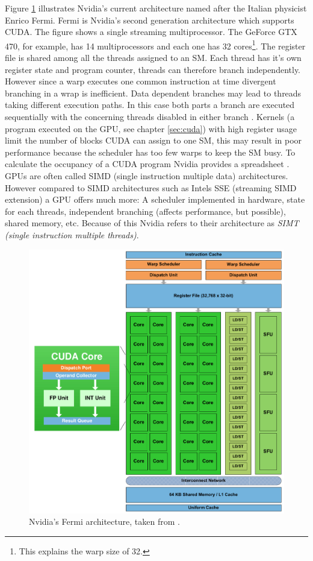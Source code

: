 Figure \ref{gfx:fermi} illustrates Nvidia's current architecture named after the Italian physicist Enrico Fermi. Fermi is Nvidia's second generation architecture which supports CUDA. The figure shows a single streaming multiprocessor. The GeForce GTX 470, for example, has 14 multiprocessors and each one has 32 cores\footnote{This explains the warp size of 32.}. The register file is shared among all the threads assigned to an SM. Each thread has it's own register state and program counter, threads can therefore branch independently. However since a warp executes one common instruction at time divergent branching in a wrap is inefficient. Data dependent branches may lead to threads taking different execution paths. In this case both parts a branch are executed sequentially with the concerning threads disabled in either branch \cite[Chapter 4.1]{cudaguide}. Kernels (a program executed on the GPU, see chapter \ref{sec:cuda}) with high register usage limit the number of blocks CUDA can assign to one SM, this may result in poor performance because the scheduler has too few warps to keep the SM busy. To calculate the occupancy of a CUDA program Nvidia provides a spreadsheet \cite{occupancySpreadsheet}. GPUs are often called SIMD (single instruction multiple data) architectures. However compared to SIMD architectures such as Intels SSE (streaming SIMD extension) a GPU offers much more: A scheduler implemented in hardware, state for each threads, independent branching (affects performance, but possible), shared memory, etc. Because of this Nvidia refers to their architecture as \emph{SIMT (single instruction multiple threads)}.

\begin{figure}[H]
  \centering
  \includegraphics[scale=0.6]{content/gfx/FermiArch.pdf}
  \caption{Nvidia's Fermi architecture, taken from \cite{fermiWhitepaper}.}
  \label{gfx:fermi}
\end{figure}

